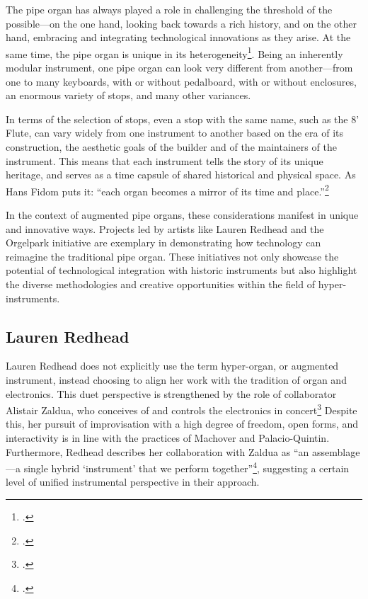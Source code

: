 \documentclass[12pt,twoside,maitrise]{dms_ks}
\theoremstyle{definition}
\begin{document}
{The pipe organ has always played a role in challenging the threshold of the possible---on the one hand, looking back towards a rich history, and on the other hand, embracing and integrating technological innovations as they arise. 
At the same time, the pipe organ is unique in its heterogeneity\footcite[344--345]{redhead_developing_2023}. 
Being an inherently modular instrument, one pipe organ can look very different from another---from one to many keyboards, with or without pedalboard, with or without enclosures, an enormous variety of stops, and many other variances. 

In terms of the selection of stops, even a stop with the same name, such as the 8' Flute, can vary widely from one instrument to another based on the era of its construction, the aesthetic goals of the builder and of the maintainers of the instrument. 
This means that each instrument tells the story of its unique heritage, and serves as a time capsule of shared historical and physical space.
As Hans Fidom puts it: “each organ becomes a mirror of its time and place.”\footcite[18]{fidom_digital_2014}

In the context of augmented pipe organs, these considerations manifest in unique and innovative ways.
Projects led by artists like Lauren Redhead and the Orgelpark initiative are exemplary in demonstrating how technology can reimagine the traditional pipe organ.
These initiatives not only showcase the potential of technological integration with historic instruments but also highlight the diverse methodologies and creative opportunities within the field of hyper-instruments.

\subsection{Lauren Redhead}

Lauren Redhead does not explicitly use the term hyper-organ, or augmented instrument, instead choosing to align her work with the tradition of organ and electronics. This duet perspective is strengthened by the role of collaborator Alistair Zaldua, who conceives of and controls the electronics in concert\footcite[325]{redhead_organ_2016}
Despite this, her pursuit of improvisation with a high degree of freedom, open forms, and interactivity is in line with the practices of Machover and Palacio-Quintin.
Furthermore, Redhead describes her collaboration with Zaldua as “an assemblage---a single hybrid `instrument' that we perform together”\footcite[342]{redhead_developing_2023}, suggesting a certain level of unified instrumental perspective in their approach.

}
\end{document}
